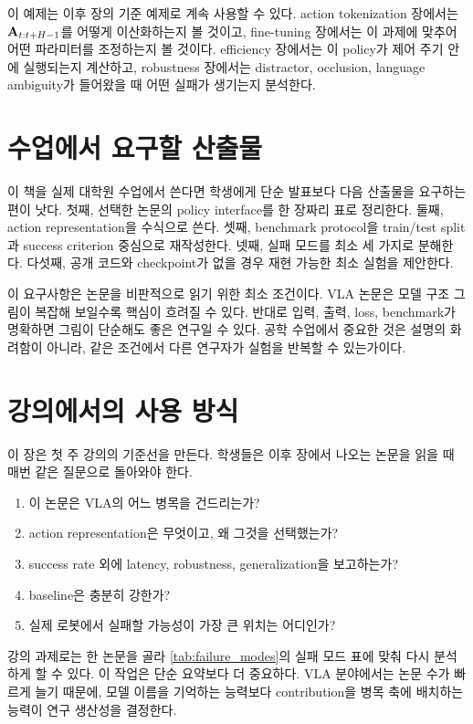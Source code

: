 이 예제는 이후 장의 기준 예제로 계속 사용할 수 있다. action tokenization 장에서는 $\mathbf{A}_{t:t+H-1}$를 어떻게 이산화하는지 볼 것이고, fine-tuning 장에서는 이 과제에 맞추어 어떤 파라미터를 조정하는지 볼 것이다. efficiency 장에서는 이 policy가 제어 주기 안에 실행되는지 계산하고, robustness 장에서는 distractor, occlusion, language ambiguity가 들어왔을 때 어떤 실패가 생기는지 분석한다.

\section{수업에서 요구할 산출물}

이 책을 실제 대학원 수업에서 쓴다면 학생에게 단순 발표보다 다음 산출물을 요구하는 편이 낫다. 첫째, 선택한 논문의 policy interface를 한 장짜리 표로 정리한다. 둘째, action representation을 수식으로 쓴다. 셋째, benchmark protocol을 train/test split과 success criterion 중심으로 재작성한다. 넷째, 실패 모드를 최소 세 가지로 분해한다. 다섯째, 공개 코드와 checkpoint가 없을 경우 재현 가능한 최소 실험을 제안한다.

이 요구사항은 논문을 비판적으로 읽기 위한 최소 조건이다. VLA 논문은 모델 구조 그림이 복잡해 보일수록 핵심이 흐려질 수 있다. 반대로 입력, 출력, loss, benchmark가 명확하면 그림이 단순해도 좋은 연구일 수 있다. 공학 수업에서 중요한 것은 설명의 화려함이 아니라, 같은 조건에서 다른 연구자가 실험을 반복할 수 있는가이다.

\section{강의에서의 사용 방식}

이 장은 첫 주 강의의 기준선을 만든다. 학생들은 이후 장에서 나오는 논문을 읽을 때 매번 같은 질문으로 돌아와야 한다.

\begin{enumerate}
  \item 이 논문은 VLA의 어느 병목을 건드리는가?
  \item action representation은 무엇이고, 왜 그것을 선택했는가?
  \item success rate 외에 latency, robustness, generalization을 보고하는가?
  \item baseline은 충분히 강한가?
  \item 실제 로봇에서 실패할 가능성이 가장 큰 위치는 어디인가?
\end{enumerate}

강의 과제로는 한 논문을 골라 \cref{tab:failure_modes}의 실패 모드 표에 맞춰 다시 분석하게 할 수 있다. 이 작업은 단순 요약보다 더 중요하다. VLA 분야에서는 논문 수가 빠르게 늘기 때문에, 모델 이름을 기억하는 능력보다 contribution을 병목 축에 배치하는 능력이 연구 생산성을 결정한다.


